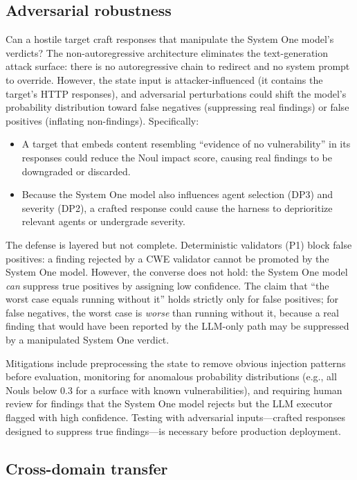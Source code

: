 \documentclass[conference]{IEEEtran}
\begin{document}
\subsection{Adversarial robustness}

Can a hostile target craft responses that manipulate the System One model's verdicts? The non-autoregressive architecture eliminates the text-generation attack surface: there is no autoregressive chain to redirect and no system prompt to override. However, the state input is attacker-influenced (it contains the target's HTTP responses), and adversarial perturbations could shift the model's probability distribution toward false negatives (suppressing real findings) or false positives (inflating non-findings). Specifically:

\begin{itemize}[leftmargin=*]
\item A target that embeds content resembling ``evidence of no vulnerability'' in its responses could reduce the Noul impact score, causing real findings to be downgraded or discarded.
\item Because the System One model also influences agent selection (DP3) and severity (DP2), a crafted response could cause the harness to deprioritize relevant agents or undergrade severity.
\end{itemize}

The defense is layered but not complete. Deterministic validators (P1) block false positives: a finding rejected by a CWE validator cannot be promoted by the System One model. However, the converse does not hold: the System One model \emph{can} suppress true positives by assigning low confidence. The claim that ``the worst case equals running without it'' holds strictly only for false positives; for false negatives, the worst case is \emph{worse} than running without it, because a real finding that would have been reported by the LLM-only path may be suppressed by a manipulated System One verdict.

Mitigations include preprocessing the state to remove obvious injection patterns before evaluation, monitoring for anomalous probability distributions (e.g., all Nouls below 0.3 for a surface with known vulnerabilities), and requiring human review for findings that the System One model rejects but the LLM executor flagged with high confidence. Testing with adversarial inputs---crafted responses designed to suppress true findings---is necessary before production deployment.

\subsection{Cross-domain transfer}
\end{document}
